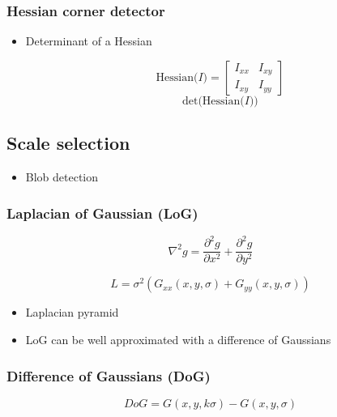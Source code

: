 \documentclass{article}
\begin{document}
        \subsubsection{Hessian corner detector}
        \begin{itemize}
            \item Determinant of a Hessian
            
            \[
                \text{Hessian($I$)} = \begin{bmatrix}  %
                    I_{xx} & I_{xy} \\
                    I_{xy} & I_{yy}
                \end{bmatrix}
            \]
            \[
                \text{det(Hessian($I$))}  %
            \]
        \end{itemize}
    
    \subsection{Scale selection}
    \begin{itemize}
        \item Blob detection
    \end{itemize}

        \subsubsection{Laplacian of Gaussian (LoG)}
        \[
            \nabla^2 g = \frac{\partial^2 g}{\partial{x}^2} + \frac{\partial^2 g}{\partial{y}^2}
        \]
        
        \[
            L = \sigma^2 (G_{xx}(x, y, \sigma) + G_{yy}(x, y, \sigma))
        \]

        \begin{itemize}
            \item Laplacian pyramid
            \item LoG can be well approximated with a difference of Gaussians

        \end{itemize}
        
        \subsubsection{Difference of Gaussians (DoG)}
        \[
            DoG = G(x, y, k \sigma) - G(x, y, \sigma)
        \]
        
\end{document}
